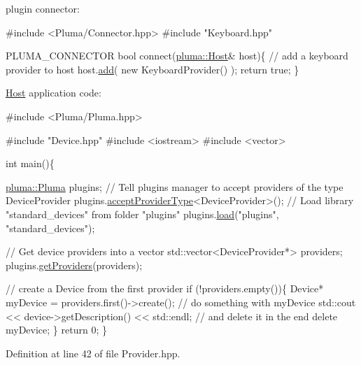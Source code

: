 plugin connector\+: 
\begin{DoxyCode}
\textcolor{preprocessor}{#include <Pluma/Connector.hpp>}
\textcolor{preprocessor}{#include "Keyboard.hpp"}

PLUMA\_CONNECTOR
\textcolor{keywordtype}{bool} connect(\hyperlink{classpluma_1_1_host}{pluma::Host}& host)\{
    \textcolor{comment}{// add a keyboard provider to host}
    host.\hyperlink{classpluma_1_1_host_ab673ba94ff56a12cdf2a7a25ebb8cc36}{add}( \textcolor{keyword}{new} KeyboardProvider() );
    \textcolor{keywordflow}{return} \textcolor{keyword}{true};
\}
\end{DoxyCode}


\hyperlink{classpluma_1_1_host}{Host} application code\+: 
\begin{DoxyCode}
\textcolor{preprocessor}{#include <Pluma/Pluma.hpp>}

\textcolor{preprocessor}{#include "Device.hpp"}
\textcolor{preprocessor}{#include <iostream>}
\textcolor{preprocessor}{#include <vector>}

\textcolor{keywordtype}{int} main()\{

    \hyperlink{classpluma_1_1_pluma}{pluma::Pluma} plugins;
    \textcolor{comment}{// Tell plugins manager to accept providers of the type DeviceProvider}
    plugins.\hyperlink{classpluma_1_1_pluma_a200c59b0983c7ca53d11b03cf8220bc7}{acceptProviderType}<DeviceProvider>();
    \textcolor{comment}{// Load library "standard\_devices" from folder "plugins"}
    plugins.\hyperlink{classpluma_1_1_plugin_manager_aa00400d23efa8a8f94e44dd1c5bf54e6}{load}(\textcolor{stringliteral}{"plugins"}, \textcolor{stringliteral}{"standard\_devices"});

    \textcolor{comment}{// Get device providers into a vector}
    std::vector<DeviceProvider*> providers;
    plugins.\hyperlink{classpluma_1_1_pluma_a49fa0b2b4497885c4e978259be0a7abe}{getProviders}(providers);

    \textcolor{comment}{// create a Device from the first provider}
    \textcolor{keywordflow}{if} (!providers.empty())\{
        Device* myDevice = providers.first()->create();
        \textcolor{comment}{// do something with myDevice}
        std::cout << device->getDescription() << std::endl;
        \textcolor{comment}{// and delete it in the end}
        \textcolor{keyword}{delete} myDevice;
    \}
    \textcolor{keywordflow}{return} 0;
\}
\end{DoxyCode}
 

Definition at line 42 of file Provider.\+hpp.



